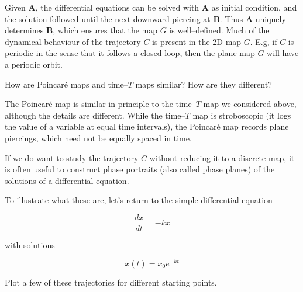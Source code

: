Given ${\mathbf A}$, the differential equations can be solved with ${\mathbf A}$ as initial condition, and the solution followed until the next downward piercing at ${\mathbf B}$. Thus ${\mathbf A}$ uniquely determines ${\mathbf B}$, which ensures that the map $G$ is well--defined. Much of the dynamical behaviour of the trajectory $C$ is present in the 2D map $G$. E.g, if $C$ is periodic in the sense that it follows a closed loop, then the plane map $G$ will have a periodic orbit.

\begin{cue}
How are Poincar\'{e} maps and time--$T$ maps similar? How are they different?   
\end{cue}

The Poincar\'{e} map is similar in principle to the time--$T$ map we considered above, although the details are different. While the time--$T$ map is stroboscopic (it logs the value of a variable at equal time intervals), the Poincar\'{e} map records plane piercings, which need not be equally spaced in time.

\pagebreak


If we do want to study the trajectory $C$ without reducing it to a discrete map, it is often useful to construct phase portraits (also called phase planes) of the solutions of a differential equation. 

To illustrate what these are, let's return to the simple differential equation

\begin{equation}
\frac{dx}{dt} = -k x
\end{equation} 

with solutions

\begin{equation}
x(t) = x_0 e^{-kt}
\end{equation} 

\begin{cue}
Plot a few of these trajectories for different starting points.  
\end{cue}

